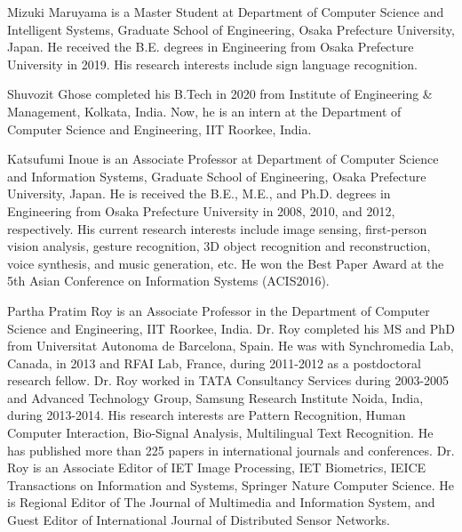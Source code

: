 \documentclass[journal]{IEEEtran}
\begin{document}
\begin{IEEEbiography}
{Mizuki Maruyama}
is a Master Student at Department of Computer Science and Intelligent Systems, Graduate School of Engineering, Osaka Prefecture University, Japan. He received the B.E. degrees in Engineering from Osaka Prefecture University in 2019. His research interests include sign language recognition.
\end{IEEEbiography}

\begin{IEEEbiography}
{Shuvozit Ghose} completed his B.Tech in 2020 from Institute of Engineering \& Management, Kolkata, India. Now, he is an intern at the Department of Computer Science and Engineering, IIT Roorkee, India.
\end{IEEEbiography}




\begin{IEEEbiography}
{Katsufumi Inoue}
is an Associate Professor at Department of Computer Science and Information Systems, 
Graduate School of Engineering, Osaka Prefecture University, Japan. He is received the B.E., M.E., and 
Ph.D. degrees in Engineering from Osaka Prefecture University in 2008, 2010, and 2012, respectively.
His current research interests include image sensing, first-person vision analysis, 
gesture recognition, 3D object recognition and reconstruction, voice synthesis, 
and music generation, etc. 
He won the Best Paper Award at the 5th Asian Conference on Information Systems (ACIS2016). 
\end{IEEEbiography}



\begin{IEEEbiography}
{Partha Pratim Roy} is an Associate Professor in the Department of Computer Science and Engineering, IIT Roorkee, India. Dr. Roy completed his MS and PhD from Universitat Autonoma de Barcelona, Spain. He was with Synchromedia Lab, Canada, in 2013 and RFAI Lab, France, during 2011-2012 as a postdoctoral research fellow. Dr. Roy worked in TATA Consultancy Services during 2003-2005 and Advanced Technology Group, Samsung Research Institute Noida, India, during 2013-2014. His research interests are Pattern Recognition, Human Computer Interaction, Bio-Signal Analysis, Multilingual Text Recognition. He has published more than 225 papers in international journals and conferences. Dr. Roy is an Associate Editor of IET Image Processing, IET Biometrics, IEICE Transactions on Information and Systems, Springer Nature Computer Science. He is Regional Editor of The Journal of Multimedia and Information System, and Guest Editor of International Journal of Distributed Sensor Networks.
\end{IEEEbiography}
\end{document}
